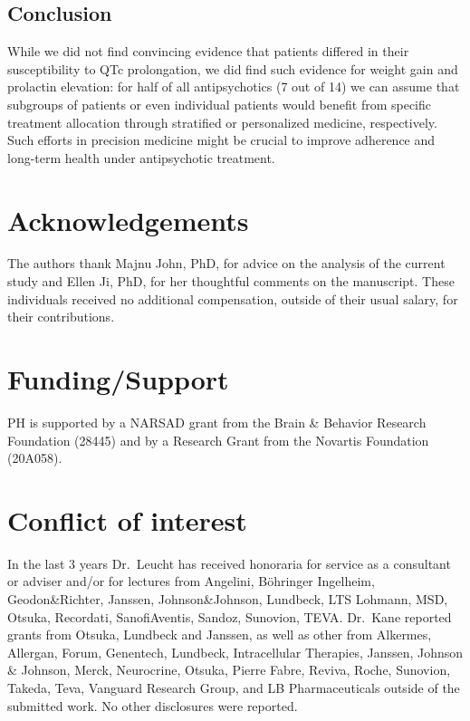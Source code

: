 \documentclass[
  9pt,
  english,
  ,jou,floatsintext]{apa6}
\begin{document}
\hypertarget{conclusion}{%
\subsection{Conclusion}\label{conclusion}}

While we did not find convincing evidence that patients differed in
their susceptibility to QTc prolongation, we did find such evidence
for weight gain and prolactin elevation: for half of all
antipsychotics (7 out of 14) we can assume that subgroups of patients
or even individual patients would benefit from specific treatment
allocation through stratified or personalized medicine,
respectively. Such efforts in precision medicine might be crucial to
improve adherence and long-term health under antipsychotic treatment.

\hypertarget{acknowledgements}{%
\section{Acknowledgements}\label{acknowledgements}}

The authors thank Majnu John, PhD, for advice on the analysis of the
current study and Ellen Ji, PhD, for her thoughtful comments on the
manuscript. These individuals received no additional compensation,
outside of their usual salary, for their contributions.

\hypertarget{fundingsupport}{%
\section{Funding/Support}\label{fundingsupport}}

PH is supported by a NARSAD grant from the Brain \& Behavior Research
Foundation (28445) and by a Research Grant from the Novartis Foundation
(20A058).

\hypertarget{conflict-of-interest}{%
\section{Conflict of interest}\label{conflict-of-interest}}

In the last 3 years Dr.~Leucht has received honoraria for service as a
consultant or adviser and/or for lectures from Angelini, Böhringer
Ingelheim, Geodon\&Richter, Janssen, Johnson\&Johnson, Lundbeck, LTS
Lohmann, MSD, Otsuka, Recordati, SanofiAventis, Sandoz, Sunovion,
TEVA. Dr.~Kane reported grants from Otsuka, Lundbeck and Janssen, as
well as other from Alkermes, Allergan, Forum, Genentech, Lundbeck,
Intracellular Therapies, Janssen, Johnson \& Johnson, Merck, Neurocrine,
Otsuka, Pierre Fabre, Reviva, Roche, Sunovion, Takeda, Teva, Vanguard
Research Group, and LB Pharmaceuticals outside of the submitted work. No
other disclosures were reported.
\end{document}

